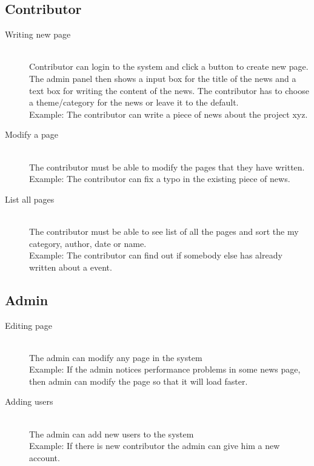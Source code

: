 \documentclass[12pt,a4paper,oneside,draft]{book}
\begin{document}
\subsection{Contributor}
\begin{description}
  \item[Writing new page] \hfill \\
	Contributor can login to the system and click a button to create new page. The admin panel then shows a input box for the title of the news and a text box for writing the content of the news. The contributor has to choose a theme/category for the news or leave it to the default. \hfill \\
	Example: The contributor can write a piece of news about the project xyz.
  \item[Modify a page] \hfill \\
	 The contributor must be able to modify the pages that they have written. \hfill \\
	Example: The contributor can fix a typo in the existing piece of news.
  \item[List all pages] \hfill \\
	 The contributor must be able to see list of all the pages and sort the my category, author, date or name. \hfill \\
	Example: The contributor can find out if somebody else has already written about a event.
\end{description}

\subsection{Admin}
\begin{description}
  \item[Editing page] \hfill \\
	The admin can modify any page in the system \hfill \\
	Example: If the admin notices performance problems in some news page, then admin can modify the page so that it will load faster.
  \item[Adding users] \hfill \\
	The admin can add new users to the system \hfill \\
	Example: If there is new contributor the admin can give him a new account.
\end{description}
\end{document}
